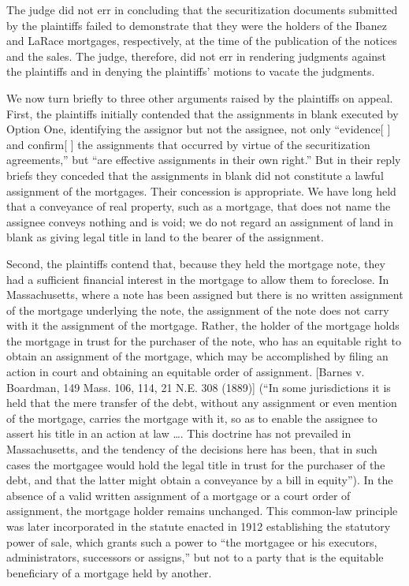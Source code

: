 The judge did not err in concluding that the securitization documents submitted
by the plaintiffs failed to demonstrate that they were the holders of the
Ibanez and LaRace mortgages, respectively, at the time of the publication of
the notices and the sales. The judge, therefore, did not err in rendering
judgments against the plaintiffs and in denying the plaintiffs' motions to
vacate the judgments. 

We now turn briefly to three other arguments raised by the plaintiffs on appeal.
First, the plaintiffs initially contended that the assignments in blank
executed by Option One, identifying the assignor but not the assignee, not only
``evidence[ ] and confirm[ ] the assignments that occurred by virtue of the
securitization agreements,'' but ``are effective assignments in their own
right.'' But in their reply briefs they conceded that the assignments in blank
did not constitute a lawful assignment of the mortgages. Their concession is
appropriate. We have long held that a conveyance of real property, such as a
mortgage, that does not name the assignee conveys nothing and is void; we do
not regard an assignment of land in blank as giving legal title in land to the
bearer of the assignment. 

Second, the plaintiffs contend that, because they held the mortgage note, they
had a sufficient financial interest in the mortgage to allow them to foreclose.
In Massachusetts, where a note has been assigned but there is no written
assignment of the mortgage underlying the note, the assignment of the note does
not carry with it the assignment of the mortgage. Rather, the holder of the
mortgage holds the mortgage in trust for the purchaser of the note, who has an
equitable right to obtain an assignment of the mortgage, which may be
accomplished by filing an action in court and obtaining an equitable order of
assignment. [Barnes v. Boardman, 149 Mass. 106, 114, 21 N.E. 308 (1889)] (``In
some jurisdictions it is held that the mere transfer of the debt, without any
assignment or even mention of the mortgage, carries the mortgage with it, so as
to enable the assignee to assert his title in an action at law \dots . This
doctrine has not prevailed in Massachusetts, and the tendency of the decisions
here has been, that in such cases the mortgagee would hold the legal title in
trust for the purchaser of the debt, and that the latter might obtain a
conveyance by a bill in equity''). In the absence of a valid written assignment
of a mortgage or a court order of assignment, the mortgage holder remains
unchanged. This common-law principle was later incorporated in the statute
enacted in 1912 establishing the statutory power of sale, which grants such a
power to ``the mortgagee or his executors, administrators, successors or
assigns,'' but not to a party that is the equitable beneficiary of a mortgage
held by another. 

